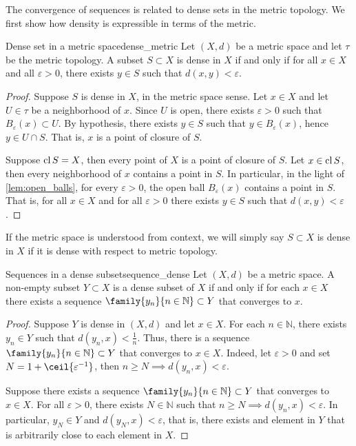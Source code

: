 The convergence of sequences is related to dense sets in the metric topology. We first show how density is expressible in terms of the metric.
\begin{theorem}{Dense set in a metric space}{dense_metric}
    Let \((X, d)\) be a metric space and let \(\tau\) be the metric topology. A subset \(S \subset X\) is dense in \(X\) if and only if for all \(x \in X\) and all \(\varepsilon > 0\), there exists \(y \in S\) such that \(d(x,y) < \varepsilon\).
\end{theorem}
\begin{proof}
    Suppose \(S\) is dense in \(X\), in the metric space sense. Let \(x\in X\) and let \(U \in \tau\) be a neighborhood of \(x\). Since \(U\) is open, there exists \(\varepsilon > 0\) such that \(B_\varepsilon(x) \subset U\). By hypothesis, there exists \(y \in S\) such that \(y \in B_\varepsilon(x)\), hence \(y \in U \cap S\). That is, \(x\) is a point of closure of \(S\).

    Suppose \(\operatorname{cl} S = X\), then every point of \(X\) is a point of closure of \(S\). Let \(x \in \operatorname{cl} S\), then every neighborhood of \(x\) contains a point in \(S\). In particular, in the light of \cref{lem:open_balls}, for every \(\varepsilon > 0\), the open ball \(B_\varepsilon(x)\) contains a point in \(S\). That is, for all \(x \in X\) and for all \(\varepsilon > 0\) there exists \(y \in S\) such that \(d(x,y) < \varepsilon\).
\end{proof}
\begin{remark}
    If the metric space is understood from context, we will simply say \(S \subset X\) is dense in \(X\) if it is dense with respect to metric topology.
\end{remark}

\begin{proposition}{Sequences in a dense subset}{sequence_dense}
    Let \((X, d)\) be a metric space. A non-empty subset \(Y \subset X\) is a dense subset of \(X\) if and only if for each \(x \in X\) there exists a sequence \(\family{y_n}{n\in \mathbb{N}} \subset Y\) that converges to \(x\).
\end{proposition}
\begin{proof}
    Suppose \(Y\) is dense in \((X, d)\) and let \(x \in X\). For each \(n \in \mathbb{N}\), there exists \(y_n \in Y\) such that \(d(y_n, x) < \frac{1}{n}\). Thus, there is a sequence \(\family{y_n}{n\in \mathbb{N}} \subset Y\) that converges to \(x \in X\). Indeed, let \(\varepsilon > 0\) and set \(N = 1+ \ceil{\varepsilon^{-1}}\), then \(n \geq N \implies d(y_n, x) < \varepsilon\).

    Suppose there exists a sequence \(\family{y_n}{n\in \mathbb{N}}\subset Y\) that converges to \(x \in X\). For all \(\varepsilon > 0\), there exists \(N \in \mathbb{N}\) such that \(n \geq N \implies d(y_n, x) < \varepsilon\). In particular, \(y_N \in Y\) and \(d(y_N, x) < \varepsilon\), that is, there exists and element in \(Y\) that is arbitrarily close to each element in \(X\).
\end{proof}

